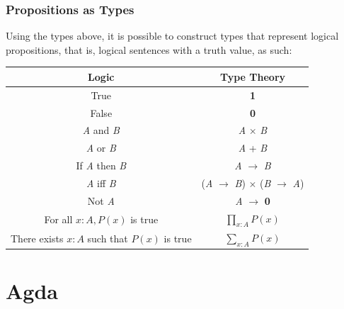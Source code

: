 \documentclass[12pt]{report}
\begin{document}
\subsection{Propositions as Types}
Using the types above, it is possible to construct types that represent logical propositions, that is, logical sentences with a truth value, as such:
\begin{center}
\begin{tabular}{|c|c|}
\hline 
\textbf{Logic} & \textbf{Type Theory} \\ 
\hline
True & \textbf{1} \\ 

False & \textbf{0} \\ 

\textit{A} and \textit{B} & \textit{A} $\times$ \textit{B} \\ 

\textit{A} or \textit{B} & \textit{A} + \textit{B} \\ 

If \textit{A} then \textit{B} & \textit{A} $ \rightarrow $ \textit{B} \\  

\textit{A} iff \textit{B} & (\textit{A} $ \rightarrow $ \textit{B}) $\times$ (\textit{B} $\rightarrow$ \textit{A})  \\ 

Not \textit{A} & \textit{A} $ \rightarrow $ \textbf{0} \\ 

For all $ x : A, P(x)$ is true & $\prod_{x : A}P(x)$\\

There exists $ x : A$ such that $P(x)$ is true & $\sum_{x : A}P(x)$\\

\hline 
\end{tabular} 
\end{center} 

\chapter{Agda}
\end{document}
